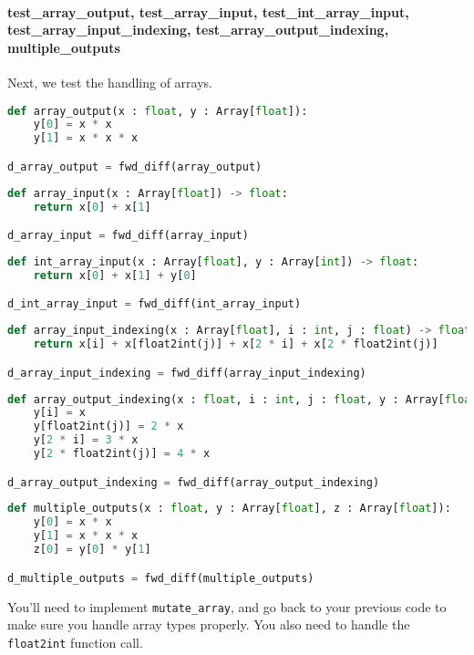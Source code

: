 \paragraph{test_array_output, test_array_input, test_int_array_input, test_array_input_indexing, test_array_output_indexing, multiple_outputs} Next, we test the handling of arrays.
\begin{lstlisting}[language=Python]
def array_output(x : float, y : Array[float]):
    y[0] = x * x
    y[1] = x * x * x

d_array_output = fwd_diff(array_output)
\end{lstlisting}
\begin{lstlisting}[language=Python]
def array_input(x : Array[float]) -> float:
    return x[0] + x[1]

d_array_input = fwd_diff(array_input)
\end{lstlisting}
\begin{lstlisting}[language=Python]
def int_array_input(x : Array[float], y : Array[int]) -> float:
    return x[0] + x[1] + y[0]

d_int_array_input = fwd_diff(int_array_input)
\end{lstlisting}
\begin{lstlisting}[language=Python]
def array_input_indexing(x : Array[float], i : int, j : float) -> float:
    return x[i] + x[float2int(j)] + x[2 * i] + x[2 * float2int(j)]

d_array_input_indexing = fwd_diff(array_input_indexing)
\end{lstlisting}
\begin{lstlisting}[language=Python]
def array_output_indexing(x : float, i : int, j : float, y : Array[float]):
    y[i] = x
    y[float2int(j)] = 2 * x
    y[2 * i] = 3 * x
    y[2 * float2int(j)] = 4 * x

d_array_output_indexing = fwd_diff(array_output_indexing)
\end{lstlisting}
\begin{lstlisting}[language=Python]
def multiple_outputs(x : float, y : Array[float], z : Array[float]):
    y[0] = x * x
    y[1] = x * x * x
    z[0] = y[0] * y[1]

d_multiple_outputs = fwd_diff(multiple_outputs)
\end{lstlisting}
You'll need to implement \lstinline{mutate_array}, and go back to your previous code to make sure you handle array types properly. You also need to handle the \lstinline{float2int} function call.

